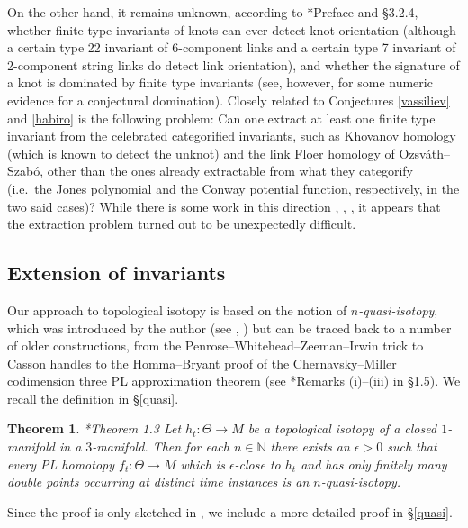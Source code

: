 \documentclass[a4paper,12pt,reqno,oneside]{amsart} %
\theoremstyle{plain}
\newtheorem{theorem}{Theorem}[section]
\theoremstyle{definition}
\theoremstyle{named}
\renewcommand{\:}{\colon}
\def\N{\mathbb{N}}
\begin{document}
On the other hand, it remains unknown, according to \cite{CDM}*{Preface and \S3.2.4}, whether finite type invariants of knots can ever detect
knot orientation (although a certain type 22 invariant of 6-component links \cite{Lin} and a certain type 7 invariant of 2-component 
string links \cite{DK} do detect link orientation), and whether the signature of a knot is dominated by finite type invariants (see, 
however, \cite{Ga} for some numeric evidence for a conjectural domination).
Closely related to Conjectures \ref{vassiliev} and \ref{habiro} is the following problem: Can one extract at least one
finite type invariant from the celebrated categorified invariants, such as Khovanov homology (which is known to detect the unknot)
and the link Floer homology of Ozsv\'ath--Szab\'o, other than the ones already extractable from what they categorify 
(i.e.\ the Jones polynomial and the Conway potential function, respectively, in the two said cases)?
While there is some work in this direction \cite{Au}, \cite{IY}, \cite{Yo}, it appears that the 
extraction problem turned out to be unexpectedly difficult.

\subsection{Extension of invariants}
Our approach to topological isotopy is based on the notion of {\it $n$-quasi-isotopy}, which was introduced by the author 
(see \cite{MR1}, \cite{MR2}) but can be traced back to a number of older constructions, from the Penrose--Whitehead--Zeeman--Irwin 
trick to Casson handles to the Homma--Bryant proof of the Chernavsky--Miller codimension three PL approximation theorem 
(see \cite{MR1}*{Remarks (i)--(iii) in \S1.5}).
We recall the definition in \S\ref{quasi}.

\begin{theorem} \cite{MR1}*{Theorem 1.3} \label{isotopy0}
Let $h_t\:\Theta\to M$ be a topological isotopy of a closed $1$-manifold in a $3$-manifold.
Then for each $n\in\N$ there exists an $\epsilon>0$ such that every PL homotopy $f_t\:\Theta\to M$ which is $\epsilon$-close to $h_t$ and has only 
finitely many double points occurring at distinct time instances is an $n$-quasi-isotopy.
\end{theorem}

Since the proof is only sketched in \cite{MR1}, we include a more detailed proof in \S\ref{quasi}.
\end{document}
